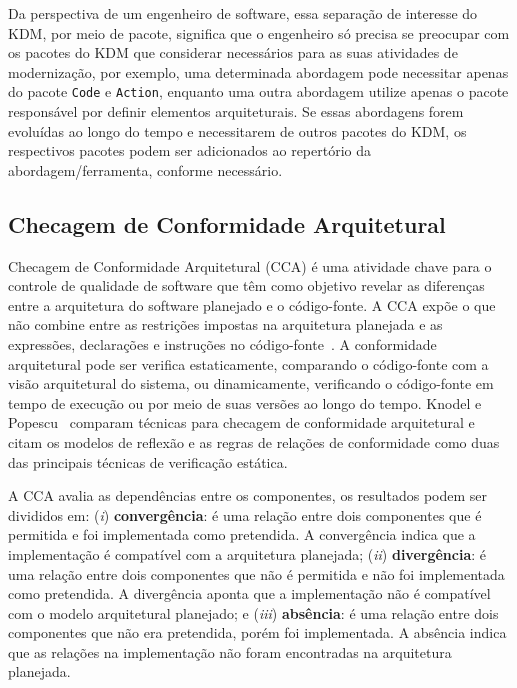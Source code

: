 \documentclass[12pt]{article}
\begin{document}
Da perspectiva de um engenheiro de software, essa separação de interesse do KDM, por meio de pacote, significa que o engenheiro só precisa se preocupar com os pacotes do KDM que considerar necessários para as suas atividades de modernização, por exemplo, uma determinada abordagem pode necessitar apenas do pacote \texttt{Code} e \texttt{Action}, enquanto uma outra abordagem utilize apenas o pacote responsável por definir elementos arquiteturais. Se essas abordagens forem evoluídas ao longo do tempo e necessitarem de outros pacotes do KDM, os respectivos pacotes podem ser adicionados ao repertório da abordagem/ferramenta, conforme necessário.

\subsection{Checagem de Conformidade Arquitetural}


Checagem de Conformidade Arquitetural (CCA) é uma atividade chave para o controle de qualidade de software que têm como objetivo revelar as diferenças entre a arquitetura do software planejado e o código-fonte. A CCA expõe o que não combine entre as restrições impostas na arquitetura planejada e as expressões, declarações e instruções no código-fonte~\cite{Knodel_2007}. A conformidade arquitetural pode ser verifica estaticamente, comparando o código-fonte com a visão arquitetural do sistema, ou dinamicamente, verificando o código-fonte em tempo de execução ou por meio de suas versões ao longo do tempo. Knodel e Popescu~\cite{Knodel_2007} comparam técnicas para checagem de conformidade arquitetural e citam os modelos de reflexão e as regras de relações de conformidade como duas das principais técnicas de verificação estática. 

A CCA avalia as dependências entre os componentes, os resultados podem ser divididos em: (\textit{i}) \textbf{convergência}: é uma relação entre dois componentes que é permitida e foi implementada como pretendida. A convergência indica que a implementação é compatível com a arquitetura planejada; (\textit{ii}) \textbf{divergência}: é uma relação entre dois componentes que não é permitida e não foi implementada como pretendida. A divergência aponta que a implementação não é compatível com o modelo arquitetural planejado; e (\textit{iii}) \textbf{absência}: é uma relação entre dois componentes que não era pretendida, porém foi implementada. A absência indica que as relações na implementação não foram encontradas na arquitetura planejada.
\end{document}
